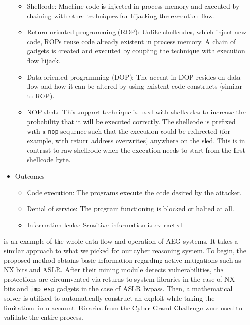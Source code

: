 \documentclass[../main.tex]{subfiles}
\begin{document}
\begin{itemize}
            \begin{itemize}
                  \tightlist
                  \item
                        Shellcode: Machine code is injected in process memory and executed
                        by chaining with other techniques for hijacking the execution flow.
                  \item
                        Return-oriented programming (ROP): Unlike shellcodes, which inject new
                        code, ROPs reuse code already existent in process memory. A chain of
                        gadgets is created and executed by coupling the technique with
                        execution flow hijack.
                  \item
                        Data-oriented programming (DOP): The accent in DOP resides on data flow
                        and how it can be altered by using existent code constructs (similar
                        to ROP).
                  \item
                        NOP sleds: This support technique is used with shellcodes to
                        increase the probability that it will be executed correctly. The
                        shellcode is prefixed with a \texttt{nop} sequence such that the
                        execution could be redirected (for example, with return address
                        overwrites) anywhere on the sled. This is in contrast to raw
                        shellcode when the execution needs to start from the first shellcode
                        byte.
            \end{itemize}
      \item
            Outcomes

            \begin{itemize}
                  \tightlist
                  \item
                        Code execution: The programs execute the code desired by the
                        attacker.
                  \item
                        Denial of service: The program functioning is blocked or halted at
                        all.
                  \item
                        Information leaks: Sensitive information is extracted.
            \end{itemize}
\end{itemize}

\cite{bof_aeg} is an example of the whole data flow and operation of AEG
systems. It takes a similar approach to what we picked for our cyber
reasoning system. To begin, the proposed method obtains basic
information regarding active mitigations such as NX bits and ASLR. After
their mining module detects vulnerabilities, the protections are
circumvented via returns to system libraries in the case of NX bits and
\texttt{jmp\ esp} gadgets in the case of ASLR bypass. Then, a mathematical
solver is utilized to automatically construct an exploit while taking
the limitations into account. Binaries from the Cyber Grand Challenge
were used to validate the entire process.
\end{document}
